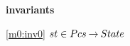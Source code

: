 \textbf{invariants}
\begin{block}
\item[ \eqref{m0:inv0} ]{$st \in Pcs \mathbin\rightarrow State $} %
\end{block}
